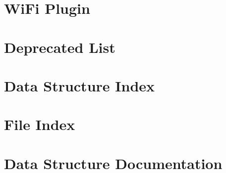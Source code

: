 \documentclass[twoside]{book}
\newcommand{\+}{\discretionary{\mbox{\scriptsize$\hookleftarrow$}}{}{}}
\begin{document}
\chapter{Wi\+Fi Plugin}
\label{external_proj_mainpage}
\hypertarget{external_proj_mainpage}{}

\chapter{Deprecated List}
\label{deprecated}
\hypertarget{deprecated}{}

\chapter{Data Structure Index}

\chapter{File Index}

\chapter{Data Structure Documentation}







\end{document}
